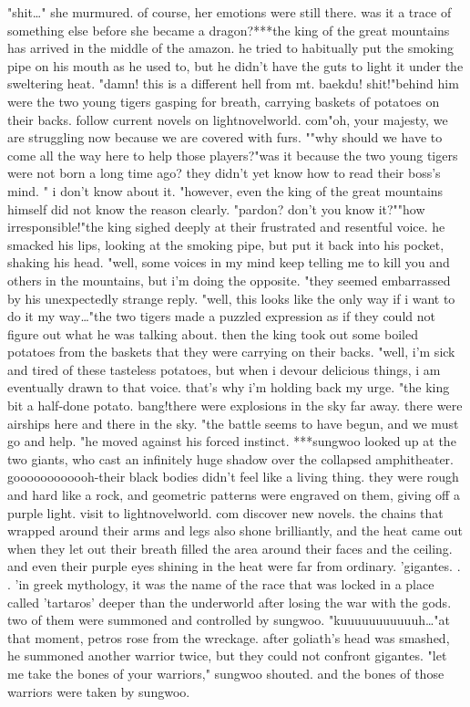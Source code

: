 "shit…" she murmured.
 of course, her emotions were still there.
 was it a trace of something else before she became a dragon?***the king of the great mountains has arrived in the middle of the amazon.
 he tried to habitually put the smoking pipe on his mouth as he used to, but he didn't have the guts to light it under the sweltering heat.
"damn! this is a different hell from mt.
 baekdu! shit!"behind him were the two young tigers gasping for breath, carrying baskets of potatoes on their backs.
follow current novels on lightnovelworld.
com"oh, your majesty, we are struggling now because we are covered with furs.
""why should we have to come all the way here to help those players?"was it because the two young tigers were not born a long time ago? they didn't yet know how to read their boss's mind.
" i don't know about it.
"however, even the king of the great mountains himself did not know the reason clearly.
"pardon? don't you know it?""how irresponsible!"the king sighed deeply at their frustrated and resentful voice.
he smacked his lips, looking at the smoking pipe, but put it back into his pocket, shaking his head.
"well, some voices in my mind keep telling me to kill you and others in the mountains, but i'm doing the opposite.
"they seemed embarrassed by his unexpectedly strange reply.
 "well, this looks like the only way if i want to do it my way…"the two tigers made a puzzled expression as if they could not figure out what he was talking about.
 then the king took out some boiled potatoes from the baskets that they were carrying on their backs.
"well, i'm sick and tired of these tasteless potatoes, but when i devour delicious things, i am eventually drawn to that voice.
 that's why i'm holding back my urge.
"the king bit a half-done potato.
bang!there were explosions in the sky far away.
 there were airships here and there in the sky.
"the battle seems to have begun, and we must go and help.
"he moved against his forced instinct.
***sungwoo looked up at the two giants, who cast an infinitely huge shadow over the collapsed amphitheater.
goooooooooooh-their black bodies didn't feel like a living thing.
 they were rough and hard like a rock, and geometric patterns were engraved on them, giving off a purple light.
visit to lightnovelworld.
com discover new novels.
the chains that wrapped around their arms and legs also shone brilliantly, and the heat came out when they let out their breath filled the area around their faces and the ceiling.
 and even their purple eyes shining in the heat were far from ordinary.
'gigantes.
.
.
'in greek mythology, it was the name of the race that was locked in a place called 'tartaros' deeper than the underworld after losing the war with the gods.
two of them were summoned and controlled by sungwoo.
 "kuuuuuuuuuuuh…"at that moment, petros rose from the wreckage.
after goliath's head was smashed, he summoned another warrior twice, but they could not confront gigantes.
"let me take the bones of your warriors," sungwoo shouted.
 and the bones of those warriors were taken by sungwoo.



